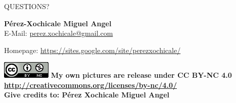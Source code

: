 \documentclass{beamer}
\begin{document}
\begin{frame}
\frametitle{}

\vspace{2cm}
\begin{center}
\LARGE{QUESTIONS?} 
\end{center}

\vspace{1cm}

\normalsize 
\textbf{P\'erez-Xochicale Miguel Angel} \\

E-Mail: {\color{blue} \href{mailto:perez.xochicale@gmail.com}{perez.xochicale@gmail.com} } 

Homepage:
{\color{blue} \href{https://sites.google.com/site/perezxochicale/}{https://sites.google.com/site/perezxochicale/} }
\vspace{1cm}


\includegraphics[scale=.4]{CC4}
\tiny{ 
\textbf{My own pictures are release under CC BY-NC 4.0
{\color{blue} \href{http://creativecommons.org/licenses/by-nc/4.0/}{http://creativecommons.org/licenses/by-nc/4.0/} } \\
Give credits to: P\'erez Xochicale Miguel Angel
}
}

\end{frame}


\frame{\titlepage}
\end{document}
